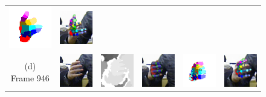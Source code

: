 \begin{figure}
\begin{tabular}{@{}cc@{}c@{}c@{}c@{}c@{}}
		\includegraphics[width=2.4cm]{fig/hand/qual/class/class-825.png} &
		\includegraphics[width=2.4cm]{fig/hand/qual/vote/image_0825.png}
		\label{fig/hand/multi3} \\
		\raisebox{1cm}{\parbox{2cm}{\centering (d)\\Frame 946}} & 
		\includegraphics[width=2.4cm]{fig/hand/qual/rgb/image_0946.png} &
		\includegraphics[width=2.4cm]{fig/hand/qual/depth/image_0946.png} &
		\includegraphics[width=2.4cm]{fig/hand/qual/forth/image_0946.png} &
		\includegraphics[width=2.4cm]{fig/hand/qual/class/class-946.png} &
		\includegraphics[width=2.4cm]{fig/hand/qual/vote/image_0946.png}

\end{tabular}
\end{figure}
